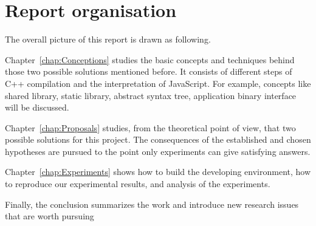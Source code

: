 \section{Report organisation}

The overall picture of this report is drawn as following.

Chapter~\ref{chap:Conceptions} studies the basic concepts and techniques behind those two possible solutions mentioned before. It consists of different steps of C++ compilation and the interpretation of JavaScript. For example, concepts like shared library, static library, abstract syntax tree, application binary interface will be discussed. 

Chapter~\ref{chap:Proposals} studies, from the theoretical point of view, that two possible solutions for this project. The consequences of the established and chosen hypotheses are pursued to the point only experiments can give satisfying answers.

Chapter~\ref{chap:Experiments} shows how to build the developing environment, how to reproduce our experimental results, and analysis of the experiments.

Finally, the conclusion summarizes the work and introduce new research issues that are worth pursuing

